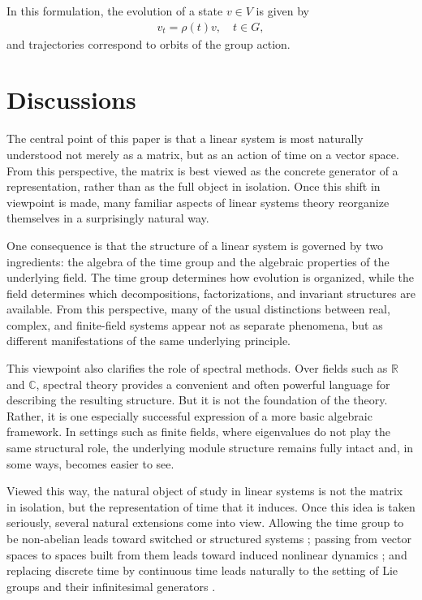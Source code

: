 \documentclass[letterpaper, 9pt, conference]{ieeeconf}
\begin{document}
In this formulation, the evolution of a state $v \in V$ is given by
\begin{eqnarray}
v_t = \rho(t)v, \quad t \in G,
\end{eqnarray}
and trajectories correspond to orbits of the group action. 




\section{Discussions}\label{sec_discussion}

The central point of this paper is that a linear system is most naturally
understood not merely as a matrix, but as an action of time on a vector space.
From this perspective, the matrix is best viewed as the concrete generator of a
representation, rather than as the full object in isolation. Once this shift in
viewpoint is made, many familiar aspects of linear systems theory reorganize
themselves in a surprisingly natural way.

One consequence is that the structure of a linear system is governed by two
ingredients: the algebra of the time group and the algebraic properties of the
underlying field. The time group determines how evolution is organized, while
the field determines which decompositions, factorizations, and invariant
structures are available. From this perspective, many of the usual distinctions
between real, complex, and finite-field systems appear not as separate
phenomena, but as different manifestations of the same underlying principle.

This viewpoint also clarifies the role of spectral methods. Over fields such as
$\mathbb{R}$ and $\mathbb{C}$, spectral theory provides a convenient and often
powerful language for describing the resulting structure. But it is not the
foundation of the theory. Rather, it is one especially successful expression of
a more basic algebraic framework. In settings such as finite fields, where
eigenvalues do not play the same structural role, the underlying module
structure remains fully intact and, in some ways, becomes easier to see.

Viewed this way, the natural object of study in linear systems is not the
matrix in isolation, but the representation of time that it induces. Once this
idea is taken seriously, several natural extensions come into view. Allowing the
time group to be non-abelian leads toward switched or structured systems
\cite{swtiched_system_non_abelian_time}; passing from vector spaces to spaces
built from them leads toward induced nonlinear dynamics
\cite{dani_homogeneous_space,kleeman_linear_algebra_dynamical_systems}; and
replacing discrete time by continuous time leads naturally to the setting of Lie
groups and their infinitesimal generators
\cite{hall_lie_group_representation_book}. 
\end{document}
